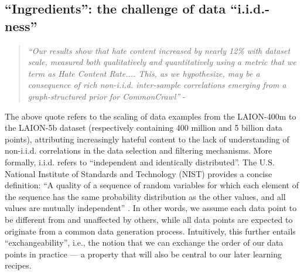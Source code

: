 \documentclass[manuscript,screen,authorversion,nonacm]{acmart}
\begin{document}
\subsection{``Ingredients'': the challenge of data ``i.i.d.-ness''}
\begin{quote}
\emph{``Our results show that hate content increased by nearly 12\% with dataset scale, measured both qualitatively and quantitatively using a metric that we term as Hate Content Rate.... This, as we hypothesize, may be a consequence of rich non-i.i.d. inter-sample correlations emerging from a graph-structured prior for CommonCrawl''} - \citet{Birhane2023laions}
\end{quote}

\noindent The above quote refers to the scaling of data examples from the LAION-400m \cite{Schuhmann2021Laion400m} to the LAION-5b \cite{Schuhmann2022Laion5b} dataset (respectively containing 400 million and 5 billion data points), attributing increasingly hateful content to the lack of understanding of non-i.i.d. correlations in the data selection and filtering mechanisms. 
More formally, i.i.d. refers to ``independent and identically distributed''. The U.S. National Institute of Standards and Technology (NIST) provides a concise definition: ``A quality of a sequence of random variables for which each element of the sequence has the same probability distribution as the other values, and all values are mutually independent'' \cite{NIST2018IID}. In other words, we assume each data point to be different from and unaffected by others, while all data points are expected to originate from a common data generation process. Intuitively, this further entails ``exchangeability'', i.e., the notion that we can exchange the order of our data points in practice ---  a property that will also be central to our later learning recipes.
\end{document}
